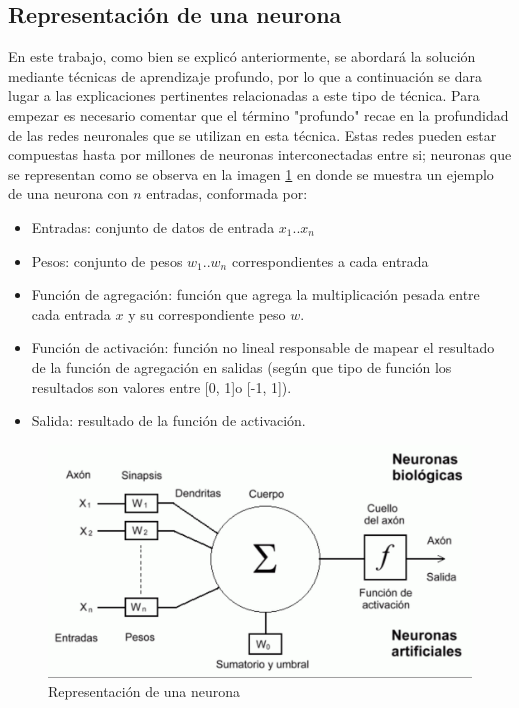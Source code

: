 \subsection{Representación de una neurona}
 En este trabajo, como bien se explicó anteriormente, se abordará la solución mediante técnicas de aprendizaje profundo, por lo que a continuación se dara lugar a las explicaciones pertinentes relacionadas a este tipo de técnica.
 Para empezar es necesario comentar que el término "profundo" recae en la profundidad de las redes neuronales que se utilizan en esta técnica. Estas redes pueden estar compuestas hasta por millones de neuronas interconectadas entre si; neuronas que se representan como se observa en la imagen \ref{fig:representacion_neurona} en donde se muestra un ejemplo de una neurona con \(n\) entradas, conformada por: 
 \begin{itemize}
 	\item Entradas: conjunto de datos de entrada \(x_1\)..\(x_n\)
 	\item Pesos: conjunto de pesos \(w_1\)..\(w_n\) correspondientes a cada entrada
 	\item Función de agregación: función que agrega la multiplicación pesada entre cada entrada \(x\) y su correspondiente peso \(w\).
	\item Función de activación: función no lineal responsable de mapear el resultado de la función de agregación en salidas (según que tipo de función los resultados son valores entre [0, 1]o [-1, 1]).
	\item Salida: resultado de la función de activación.
 \end{itemize}
 
 
\begin{figure}
\centering
\includegraphics[width=0.7\linewidth]{images/representacion_neurona}
\caption[Representación de una neurona]{Representación de una neurona}
\label{fig:representacion_neurona}
\end{figure}

